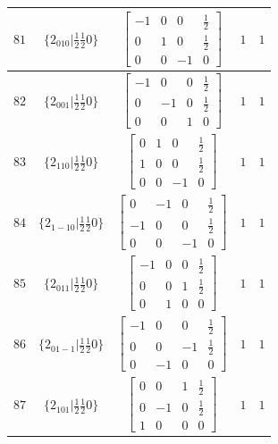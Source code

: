 \documentclass[fleqn,8pt]{jsarticle}
\begin{document}
\begin{longtable}{ccccc}
$ 81 $ & $ \{2{}_{010}|\frac{1}{2} \frac{1}{2} 0\} $ & $ \begin{bmatrix} -1 & 0 & 0 & \frac{1}{2} \\ 0 & 1 & 0 & \frac{1}{2} \\ 0 & 0 & -1 & 0 \end{bmatrix} $ & $ 1 $ & $ 1 $ \\ \hline
$ 82 $ & $ \{2{}_{001}|\frac{1}{2} \frac{1}{2} 0\} $ & $ \begin{bmatrix} -1 & 0 & 0 & \frac{1}{2} \\ 0 & -1 & 0 & \frac{1}{2} \\ 0 & 0 & 1 & 0 \end{bmatrix} $ & $ 1 $ & $ 1 $ \\ \hline
$ 83 $ & $ \{2{}_{110}|\frac{1}{2} \frac{1}{2} 0\} $ & $ \begin{bmatrix} 0 & 1 & 0 & \frac{1}{2} \\ 1 & 0 & 0 & \frac{1}{2} \\ 0 & 0 & -1 & 0 \end{bmatrix} $ & $ 1 $ & $ 1 $ \\ \hline
$ 84 $ & $ \{2{}_{1-10}|\frac{1}{2} \frac{1}{2} 0\} $ & $ \begin{bmatrix} 0 & -1 & 0 & \frac{1}{2} \\ -1 & 0 & 0 & \frac{1}{2} \\ 0 & 0 & -1 & 0 \end{bmatrix} $ & $ 1 $ & $ 1 $ \\ \hline
$ 85 $ & $ \{2{}_{011}|\frac{1}{2} \frac{1}{2} 0\} $ & $ \begin{bmatrix} -1 & 0 & 0 & \frac{1}{2} \\ 0 & 0 & 1 & \frac{1}{2} \\ 0 & 1 & 0 & 0 \end{bmatrix} $ & $ 1 $ & $ 1 $ \\ \hline
$ 86 $ & $ \{2{}_{01-1}|\frac{1}{2} \frac{1}{2} 0\} $ & $ \begin{bmatrix} -1 & 0 & 0 & \frac{1}{2} \\ 0 & 0 & -1 & \frac{1}{2} \\ 0 & -1 & 0 & 0 \end{bmatrix} $ & $ 1 $ & $ 1 $ \\ \hline
$ 87 $ & $ \{2{}_{101}|\frac{1}{2} \frac{1}{2} 0\} $ & $ \begin{bmatrix} 0 & 0 & 1 & \frac{1}{2} \\ 0 & -1 & 0 & \frac{1}{2} \\ 1 & 0 & 0 & 0 \end{bmatrix} $ & $ 1 $ & $ 1 $ \\ \hline

\end{longtable}
\end{document}
